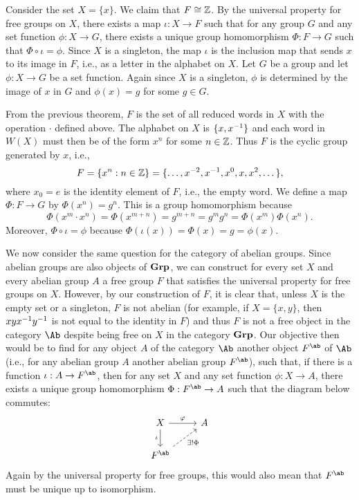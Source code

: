 \begin{example}
    \label{ex:free-group-singleton}
    Consider the set \(X = \{x\}\). We claim that \(F \cong \mathbb{Z}\). By the
    universal property for free groups on \(X\), there exists a map \(\iota : X
    \to F\) such that for any group \(G\) and any set function \(\phi : X \to
    G\), there exists a unique group homomorphism \(\Phi : F \to G\) such that
    \(\Phi \circ \iota = \phi\). Since \(X\) is a singleton, the map \(\iota\)
    is the inclusion map that sends \(x\) to its image in \(F\), i.e., as a
    letter in the alphabet on \(X\). Let \(G\) be a group and let \(\phi : X \to
    G\) be a set function. Again since \(X\) is a singleton, \(\phi\) is
    determined by the image of \(x\) in \(G\) and \(\phi(x) = g\) for some \(g
    \in G\).

    From the previous theorem, \(F\) is the set of all reduced words in \(X\)
    with the operation \(\cdot\) defined above. The alphabet on \(X\) is \(\{x,
    x^{-1}\}\) and each word in \(W(X)\) must then be of the form  \(x^n\) for
    some \(n \in \mathbb{Z}\). Thus \(F\) is the cyclic group generated by \(x\), i.e.,
    \[
        F = \{x^n : n \in \mathbb{Z}\} = \{\dots, x^{-2}, x^{-1}, x^0, x, x^2, \dots\},
    \]
    where \(x_0 = e\) is the identity element of \(F\), i.e., the empty word. We
    define a map \(\Phi : F \to G\) by \(\Phi(x^n) = g^n\). This is a group
    homomorphism because
    \[
        \Phi(x^m \cdot x^n) = \Phi(x^{m + n}) = g^{m + n} = g^m g^n = \Phi(x^m) \Phi(x^n).
    \]
    Moreover, \(\Phi \circ \iota = \phi\) because \(\Phi(\iota(x)) = \Phi(x) = g
    = \phi(x)\).
\end{example}

We now consider the same question for the category of abelian groups. Since
abelian groups are also objects of \(\mathbf{Grp}\), we can construct for every set
\(X\) and every abelian group \(A\) a free group \(F\) that satisfies the
universal property for free groups on \(X\). However, by our construction of
\(F\), it is clear that, unless \(X\) is the empty set or a singleton, \(F\) is
not abelian (for example, if \(X = \{x, y\}\), then \(xyx^{-1} y^{-1}\) is not
equal to the identity in \(F\)) and thus \(F\) is not a free object in the
category \(\Ab\) despite being free on \(X\) in the category \(\mathbf{Grp}\). Our
objective then would be to find for any object \(A\) of the category \(\Ab\)
another object \(F^\ab\) of \(\Ab\) (i.e., for any abelian group \(A\) another
abelian group \(F^\ab\)), such that, if there is a function \(\iota : A \to
F^\ab\), then for any set \(X\) and any set function \(\phi : X \to A\), there
exists a unique group homomorphism \(\Phi : F^\ab \to A\) such that the diagram
below commutes:
\[
    \begin{tikzcd}
        X \arrow[d, "\iota"'] \arrow[r, "\phi"] & A \\
        F^\ab \arrow[ru, "\exists!\Phi"', dashed] &  
    \end{tikzcd}
\]
Again by the universal property for free groups, this would also mean that
\(F^\ab\) must be unique up to isomorphism.

